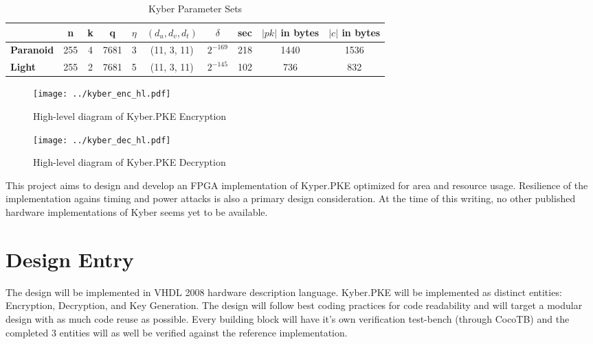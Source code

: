      \begin{table}
        \begin{adjustbox}{width=1.2\textwidth,center=\textwidth}
            \begin{tabular}{l*{9}{c}}
              \rowcolor{DispositionColor!50}              %
                                & n   & k  & q    & $\eta$ & $(d_u,d_v,d_t)$ & $\delta$ & sec & $|pk|$ in bytes & $|c|$ in bytes \\ 
              \hline
              \textbf{Paranoid} & 255 &  4 & 7681 & 3      & (11, 3, 11)  & $2^{-169}$ & 218 & 1440  & 1536 \\
              \textbf{Light}    & 255 &  2 & 7681 & 5      & (11, 3, 11)  & $2^{-145}$ & 102 & 736  & 832 \\
             \hline
            \end{tabular}
           \end{adjustbox}
        \caption{Kyber Parameter Sets \cite{bos2018} }
        \label{table:params}
        \end{table}

\begin{figure}[h]
 \texttt{[image: ../kyber\_enc\_hl.pdf]}
 \caption{High-level diagram of Kyber.PKE Encryption}
 \label{fig:kyper_enc}
\end{figure}

\begin{figure}[h]
 \texttt{[image: ../kyber\_dec\_hl.pdf]} 
 \caption{High-level diagram of Kyber.PKE Decryption}
 \label{fig:kyper_dec}
\end{figure}  

This project aims to design and develop an FPGA implementation of Kyper.PKE optimized 
for area and resource usage. Resilience of the implementation agains timing and power
 attacks is also a primary design consideration. At the time of this writing, no other
  published hardware implementations of Kyber seems yet to be available.

  \chapter{Design Entry}
  The design will be implemented in VHDL 2008 hardware description language. Kyber.PKE 
  will be implemented as distinct entities: Encryption, Decryption, and Key Generation.
   The design will follow best coding practices for code readability and will target a 
   modular design with as much code reuse as possible. Every building block will have 
   it’s own verification test-bench (through CocoTB) and the completed 3 entities will 
   as well be verified against the reference implementation.


